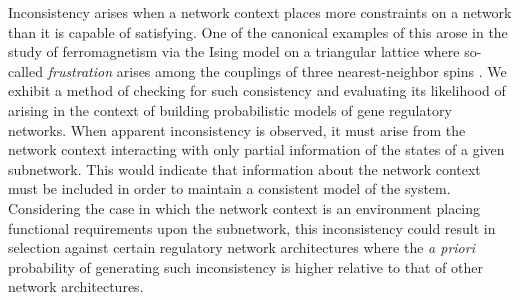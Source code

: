 Inconsistency arises when a network context places more constraints on a network than it is capable of satisfying. One of the canonical examples of this arose in the study of ferromagnetism via the Ising model on a triangular lattice where so-called \emph{frustration} arises among the couplings of three nearest-neighbor spins \cite{Wannier1950,Toulouse1977,Vannimenus1977}. We exhibit a method of checking for such consistency and evaluating its likelihood of arising in the context of building probabilistic models of gene regulatory networks. When apparent inconsistency is observed, it must arise from the network context interacting with only partial information of the states of a given subnetwork. This would indicate that information about the network context must be included in order to maintain a consistent model of the system. Considering the case in which the network context is an environment placing functional requirements upon the subnetwork, this inconsistency could result in selection against certain regulatory network architectures where the \emph{a priori} probability of generating such inconsistency is higher relative to that of other network architectures.



